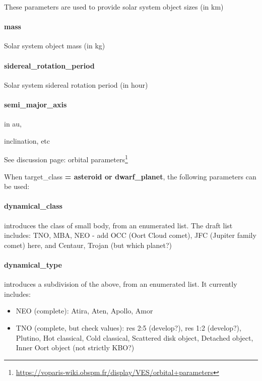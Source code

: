 \documentclass[11pt,a4paper]{ivoa}
\begin{document}
These parameters are used to provide solar system object sizes (in km)

\paragraph{mass}

Solar system object mass (in kg)

\paragraph{sidereal\_rotation\_period}

Solar system sidereal rotation period (in hour)

\paragraph{semi\_major\_axis}

in au,

inclination, etc

See discussion page: orbital parameters\footnote{\url{https://voparis-wiki.obspm.fr/display/VES/orbital+parameters}}


When target\_class\textbf{ = asteroid or dwarf\_planet}, the following parameters can be used:\textbf{\\}

\paragraph{dynamical\_class}

introduces the class of small body, from an enumerated list. The draft list includes: TNO, MBA, NEO - add OCC (Oort Cloud comet), JFC (Jupiter family comet) here, and Centaur, Trojan (but which planet?)

\paragraph{dynamical\_type}

introduces a subdivision of the above, from an enumerated list. It currently includes:

\begin{itemize}
\item NEO (complete): Atira, Aten, Apollo, Amor
\item TNO (complete, but check values): res 2:5 (develop?), res 1:2 (develop?), Plutino, Hot classical, Cold classical, Scattered disk object, Detached object, Inner Oort object (not strictly KBO?)
\end{itemize}
\end{document}

